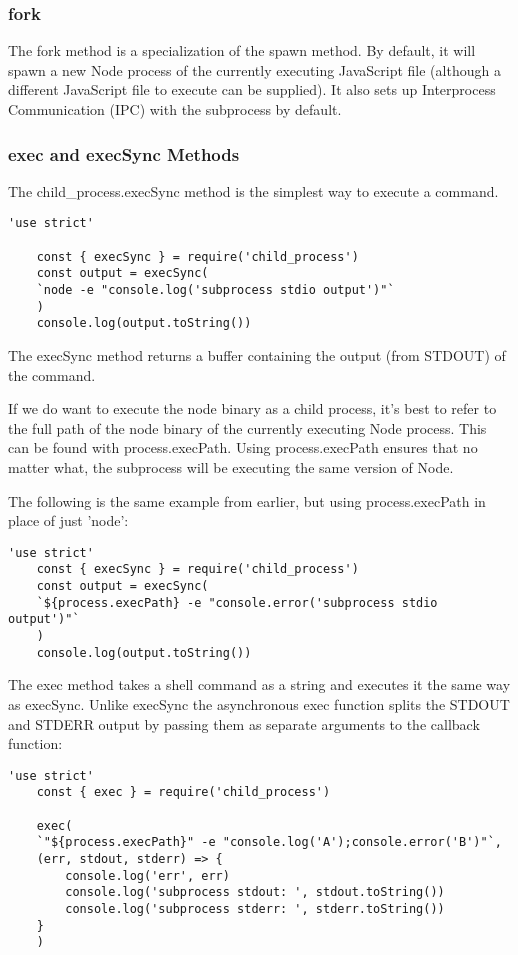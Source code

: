 \documentclass{scrartcl}
\begin{document}
\subsubsection{fork}

The fork method is a specialization of the spawn method. By default, it will spawn a new Node process of the currently executing JavaScript file (although a different JavaScript file to execute can be supplied). It also sets up Interprocess Communication (IPC) with the subprocess by default.

\subsubsection{exec and execSync Methods}

The child\_process.execSync method is the simplest way to execute a command.

\begin{lstlisting}[style=ES6]
    'use strict'

    const { execSync } = require('child_process')
    const output = execSync(
    `node -e "console.log('subprocess stdio output')"`
    )
    console.log(output.toString())
\end{lstlisting}

The execSync method returns a buffer containing the output (from STDOUT) of the command.

If we do want to execute the node binary as a child process, it's best to refer to the full path of the node binary of the currently executing Node process. This can be found with process.execPath. Using process.execPath ensures that no matter what, the subprocess will be executing the same version of Node.

The following is the same example from earlier, but using process.execPath in place of just 'node':

\begin{lstlisting}[style=ES6]
    'use strict'
    const { execSync } = require('child_process')
    const output = execSync(
    `${process.execPath} -e "console.error('subprocess stdio output')"`
    )
    console.log(output.toString())
\end{lstlisting}

The exec method takes a shell command as a string and executes it the same way as execSync. Unlike execSync the asynchronous exec function splits the STDOUT and STDERR output by passing them as separate arguments to the callback function:

\begin{lstlisting}[style=ES6]
    'use strict'
    const { exec } = require('child_process')

    exec(
    `"${process.execPath}" -e "console.log('A');console.error('B')"`,
    (err, stdout, stderr) => {
        console.log('err', err)
        console.log('subprocess stdout: ', stdout.toString())
        console.log('subprocess stderr: ', stderr.toString())
    }
    )
\end{lstlisting}
\end{document}
